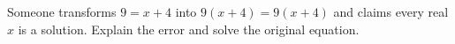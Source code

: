 Someone transforms $9=x+4$ into $9(x+4)=9(x+4)$ and claims every real $x$ is a solution. Explain the error and solve the original equation.
